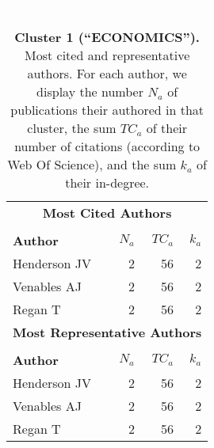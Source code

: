 \documentclass[a4paper,11pt]{report}
\begin{document}
\begin{landscape}
\clearpage

\begin{table}[!ht]
\caption*{{\bf Cluster 1 (``ECONOMICS'').} Most cited and representative authors. For each author, we display the number $N_a$ of publications their authored in that cluster, the sum $TC_a$ of their number of citations (according to Web Of Science), and the sum $k_a$ of their in-degree. }
\textcolor{white}{aa}\\
{\scriptsize\begin{tabular}{|l r r r|}
\hline
\multicolumn{4}{|c|}{{\bf Most Cited Authors}}\\
&&&\\
{\bf Author} & {\bf $N_a$} & {\bf $TC_a$} & {\bf $k_a$}\\
Henderson JV & 2 & 56 & 2 \\
Venables AJ & 2 & 56 & 2 \\
Regan T & 2 & 56 & 2 \\
\hline

\hline
\hline
\multicolumn{4}{|c|}{{\bf Most Representative Authors}}\\
&&&\\
{\bf Author} & {\bf $N_a$} & {\bf $TC_a$} & {\bf $k_a$}\\
Henderson JV & 2 & 56 & 2 \\
Venables AJ & 2 & 56 & 2 \\
Regan T & 2 & 56 & 2 \\
\hline
\end{tabular}
}
\end{table}

\clearpage


\end{landscape}
\end{document}
